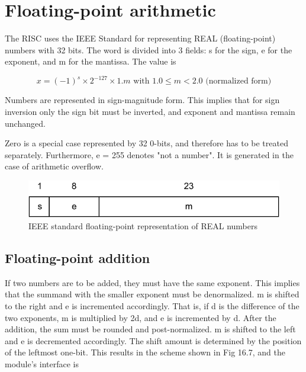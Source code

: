 \section{Floating-point arithmetic}
The RISC uses the IEEE Standard for representing REAL (floating-point) numbers with 32 bits.
The word is divided into 3 fields: s for the sign, e for the exponent, and m for the mantissa. The
value is 

\[ x = (-1)^s × 2^{-127} × 1.m\text{ with }1.0 \le m < 2.0\text{ (normalized form)} \]

Numbers are represented in sign-magnitude form. This implies that for sign inversion only the sign
bit must be inverted, and exponent and mantissa remain unchanged.

Zero is a special case represented by 32 0-bits, and therefore has to be treated separately.
Furthermore, e = 255 denotes "not a number". It is generated in the case of arithmetic overflow.

\begin{figure}[h!]
	\centering
	\includegraphics[width=.9\textwidth]{i/F/6.png}
	\caption{IEEE standard floating-point representation of REAL numbers}
	\label{fig:float-point}
\end{figure}

\subsection{Floating-point addition}
If two numbers are to be added, they must have the same exponent. This implies that the
summand with the smaller exponent must be denormalized. m is shifted to the right and e is
incremented accordingly. That is, if d is the difference of the two exponents, m is multiplied by 2d,
and e is incremented by d. After the addition, the sum must be rounded and post-normalized. m is
shifted to the left and e is decremented accordingly. The shift amount is determined by the
position of the leftmost one-bit. This results in the scheme shown in Fig 16.7, and the module's
interface is

